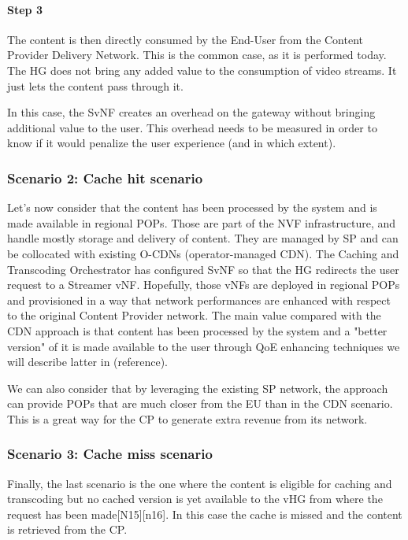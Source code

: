 \paragraph{Step 3}The content is then directly consumed by the End-User from the Content Provider Delivery Network.
This is the common case, as it is performed today.
The HG does not bring any added value to the consumption of video streams.
It just lets the content pass through it.

In this case, the SvNF creates an overhead on the gateway without bringing additional value to the user.
This overhead needs to be measured in order to know if it would penalize the user experience (and in which extent).

\subsubsection*{Scenario 2: Cache hit scenario}

Let's now consider that the content has been processed by the system and is made available in regional POPs.
Those are part of the NVF infrastructure, and handle mostly storage and delivery of content.
They are managed by SP and can be collocated with existing O-CDNs (operator-managed CDN).
The Caching and Transcoding Orchestrator has configured SvNF so that the HG redirects the user request to a Streamer vNF.
Hopefully, those vNFs are deployed in regional POPs and provisioned in a way that network performances are enhanced with respect to the original Content Provider network.
The main value compared with the CDN approach is that content has been processed by the system and a "better version" of it is made available to the user through QoE enhancing techniques we will describe latter in (reference).

We can also consider that by leveraging the existing SP network, the approach can provide POPs that are much closer from the EU than in the CDN scenario.
This is a great way for the CP to generate extra revenue from its network.	

\subsubsection*{Scenario 3: Cache miss scenario}

Finally, the last scenario is the one where the content is eligible for caching and transcoding but no cached version is yet available to the vHG from where the request has been made[N15][n16].
In this case the cache is missed and the content is retrieved from the CP.

